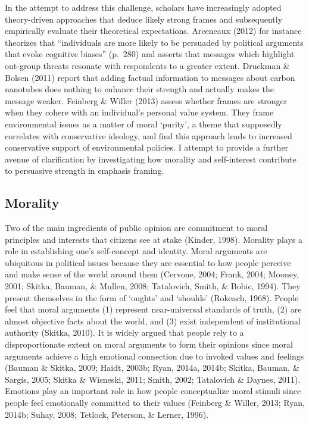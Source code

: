 \documentclass[12pt,econ]{sources/authesis}
\begin{document}
In the attempt to address this challenge, scholars have increasingly adopted theory-driven approaches that deduce likely strong frames and subsequently empirically evaluate their theoretical expectations. Arceneaux (2012) for instance theorizes that ``individuals are more likely to be persuaded by political arguments that evoke cognitive biases'' (p.~280) and asserts that messages which highlight out-group threats resonate with respondents to a greater extent. Druckman \& Bolsen (2011) report that adding factual information to messages about carbon nanotubes does nothing to enhance their strength and actually makes the message weaker. Feinberg \& Willer (2013) assess whether frames are stronger when they cohere with an individual's personal value system. They frame environmental issues as a matter of moral `purity', a theme that supposedly correlates with conservative ideology, and find this approach leads to increased conservative support of environmental policies. I attempt to provide a further avenue of clarification by investigating how morality and self-interest contribute to persuasive strength in emphasis framing.

\hypertarget{framing-theory-morality}{%
\subsection{Morality}\label{framing-theory-morality}}

Two of the main ingredients of public opinion are commitment to moral principles and interests that citizens see at stake (Kinder, 1998). Morality plays a role in establishing one's self-concept and identity. Moral arguments are ubiquitous in political issues because they are essential to how people perceive and make sense of the world around them (Cervone, 2004; Frank, 2004; Mooney, 2001; Skitka, Bauman, \& Mullen, 2008; Tatalovich, Smith, \& Bobic, 1994). They present themselves in the form of `oughts' and `shoulds' (Rokeach, 1968). People feel that moral arguments (1) represent near-universal standards of truth, (2) are almost objective facts about the world, and (3) exist independent of institutional authority (Skitka, 2010). It is widely argued that people rely to a disproportionate extent on moral arguments to form their opinions since moral arguments achieve a high emotional connection due to invoked values and feelings (Bauman \& Skitka, 2009; Haidt, 2003b; Ryan, 2014a, 2014b; Skitka, Bauman, \& Sargis, 2005; Skitka \& Wisneski, 2011; Smith, 2002; Tatalovich \& Daynes, 2011). Emotions play an important role in how people conceptualize moral stimuli since people feel emotionally committed to their values (Feinberg \& Willer, 2013; Ryan, 2014b; Suhay, 2008; Tetlock, Peterson, \& Lerner, 1996).
\end{document}
